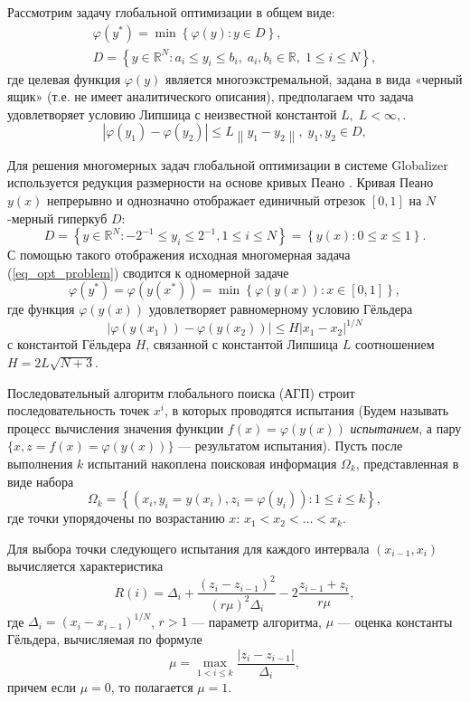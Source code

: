 \documentclass[11pt, oneside, a4paper]{article}
\begin{document}
Рассмотрим задачу глобальной оптимизации в общем виде:
\begin{gather}
\varphi(y^\ast)=\min{\left\{\varphi(y):y\in D\right\}}, \label{eq_opt_problem}\\
D=\left\{y\in \mathbb{R}^N: a_i\leq y_i \leq b_i, \; a_i,b_i\in \mathbb{R}, \;  1\leq i \leq N\right\} \label{eq_D},
\end{gather}
где целевая функция $\varphi(y)$ является многоэкстремальной, задана в вида «черный ящик» (т.е. не имеет аналитического описания), предполагаем что задача удовлетворяет условию Липшица \cite{Piyavskii1972,Shubert1972,Evtushenko2013,Zilinskas2010,Pinter1996,Jones2009} с неизвестной константой $L, \; L<\infty,$. 
\[
\left|\varphi(y_1)-\varphi(y_2)\right|\leq L\left\|y_1-y_2\right\|,\; y_1,y_2 \in D,
\]

Для решения многомерных задач глобальной оптимизации в системе Globalizer используется редукция размерности на основе кривых Пеано \cite{Sergeyev2013, Strongin2000}. Кривая Пеано $y(x)$ непрерывно и однозначно отображает единичный отрезок $[0,1]$ на $N$-мерный гиперкуб $D$:
\[
D = \left\{ y \in \mathbb{R}^N: -2^{-1} \leq y_i \leq 2^{-1}, 1 \leq i \leq N \right\} = \left\{ y(x): 0 \leq x \leq 1 \right\}.
\]
С помощью такого отображения исходная многомерная задача (\ref{eq_opt_problem}) сводится к одномерной задаче
\[
\varphi(y^\ast)=\varphi(y(x^\ast))=\min{\left\{\varphi(y(x)): x\in[0,1]\right\}},
\]
где функция $\varphi(y(x))$ удовлетворяет равномерному условию Гёльдера
\[
\left|\varphi(y(x_1))-\varphi(y(x_2))\right|\leq H\left|x_1-x_2\right|^{1/N}
\]
с константой Гёльдера $H$, связанной с константой Липшица $L$ соотношением $H = 2L\sqrt{N+3}$.

Последовательный алгоритм глобального поиска (АГП) строит последовательность точек $x^i$, в которых проводятся испытания (Будем называть процесс вычисления значения функции $f(x)=\varphi(y(x))$ \textit{испытанием}, а пару $\{x, z = f(x) = \varphi(y(x))\}$ — результатом испытания). Пусть после выполнения $k$ испытаний накоплена поисковая информация $\Omega_k$, представленная в виде набора
\[
\Omega_k = \left\{ (x_i, y_i = y(x_i), z_i = \varphi(y_i)) : 1 \leq i \leq k \right\},
\]
где точки упорядочены по возрастанию $x$: $x_1 < x_2 < \ldots < x_k$.

Для выбора точки следующего испытания для каждого интервала $(x_{i-1}, x_i)$ вычисляется характеристика
\begin{equation}
R(i) = \Delta_i + \frac{(z_i - z_{i-1})^2}{(r\mu)^2\Delta_i} - 2\frac{z_{i-1} + z_i}{r\mu}, \label{eq_R}
\end{equation}
где $\Delta_i = (x_i - x_{i-1})^{1/N}$, $r>1$ — параметр алгоритма, $\mu$ — оценка константы Гёльдера, вычисляемая по формуле
\[
\mu = \max_{1 < i \leq k} \frac{|z_i - z_{i-1}|}{\Delta_i},
\]
причем если $\mu = 0$, то полагается $\mu = 1$.
\end{document}

